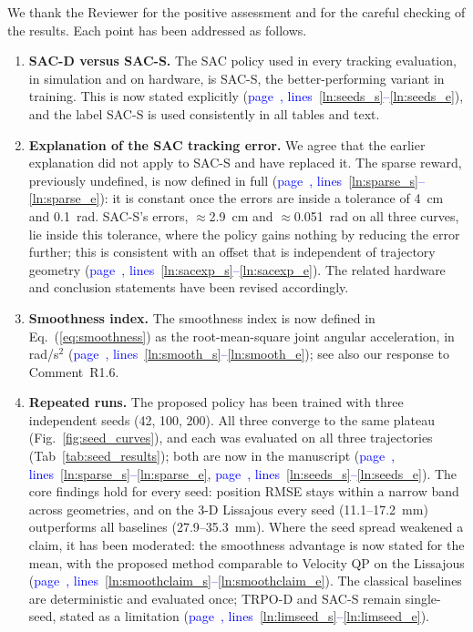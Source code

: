 \documentclass[11pt]{elsarticle}
\newcommand{\mlines}[2]{\textcolor{blue}{page~\pageref{#1}, lines~\ref{#1}--\ref{#2}}}
\begin{document}
\begin{responsebox}
We thank the Reviewer for the positive assessment and for the careful checking of the results. Each point has been addressed as follows.

\begin{enumerate}
  \item \textbf{SAC-D versus SAC-S.} The SAC policy used in every tracking evaluation, in simulation and on hardware, is SAC-S, the better-performing variant in training. This is now stated explicitly (\mlines{ln:seeds_s}{ln:seeds_e}), and the label SAC-S is used consistently in all tables and text.

  \item \textbf{Explanation of the SAC tracking error.} We agree that the earlier explanation did not apply to SAC-S and have replaced it. The sparse reward, previously undefined, is now defined in full (\mlines{ln:sparse_s}{ln:sparse_e}): it is constant once the errors are inside a tolerance of 4~cm and 0.1~rad. SAC-S's errors, $\approx$2.9~cm and $\approx$0.051~rad on all three curves, lie inside this tolerance, where the policy gains nothing by reducing the error further; this is consistent with an offset that is independent of trajectory geometry (\mlines{ln:sacexp_s}{ln:sacexp_e}). The related hardware and conclusion statements have been revised accordingly.

  \item \textbf{Smoothness index.} The smoothness index is now defined in Eq.~(\ref{eq:smoothness}) as the root-mean-square joint angular acceleration, in rad/s$^{2}$ (\mlines{ln:smooth_s}{ln:smooth_e}); see also our response to Comment~R1.6.

  \item \textbf{Repeated runs.} The proposed policy has been trained with three independent seeds (42, 100, 200). All three converge to the same plateau (Fig.~\ref{fig:seed_curves}), and each was evaluated on all three trajectories (Tab~\ref{tab:seed_results}); both are now in the manuscript (\mlines{ln:sparse_s}{ln:sparse_e}, \mlines{ln:seeds_s}{ln:seeds_e}). The core findings hold for every seed: position RMSE stays within a narrow band across geometries, and on the 3-D Lissajous every seed (11.1--17.2~mm) outperforms all baselines (27.9--35.3~mm). Where the seed spread weakened a claim, it has been moderated: the smoothness advantage is now stated for the mean, with the proposed method comparable to Velocity QP on the Lissajous (\mlines{ln:smoothclaim_s}{ln:smoothclaim_e}). The classical baselines are deterministic and evaluated once; TRPO-D and SAC-S remain single-seed, stated as a limitation (\mlines{ln:limseed_s}{ln:limseed_e}).


\end{enumerate}
\end{responsebox}
\end{document}
